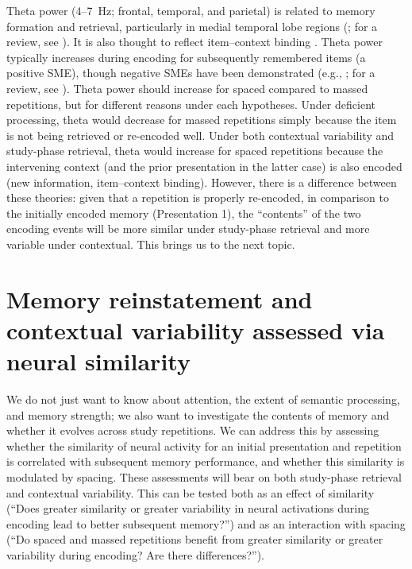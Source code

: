 Theta power (4--7~Hz; frontal, temporal, and parietal) is related to memory formation and retrieval, particularly in medial temporal lobe regions (; for a review, see ).  It is also thought to reflect item--context binding \cite{HansEtal2009a,HansEtal2011a,StauHans2013,SummMang2005}.  Theta power typically increases during encoding for subsequently remembered items (a positive SME), though negative SMEs have been demonstrated (e.g., ; for a review, see ).  Theta power should increase for spaced compared to massed repetitions, but for different reasons under each hypotheses.  Under deficient processing, theta would decrease for massed repetitions simply because the item is not being retrieved or re-encoded well.
Under both contextual variability and study-phase retrieval, theta would increase for spaced repetitions because the intervening context (and the prior presentation in the latter case) is also encoded (new information, item--context binding).
However, there is a difference between these theories: given that a repetition is properly re-encoded, in comparison to the initially encoded memory (Presentation 1), the ``contents'' of the two encoding events will be more similar under study-phase retrieval and more variable under contextual.  This brings us to the next topic.




\section{Memory reinstatement and contextual variability assessed via neural similarity}

We do not just want to know about attention, the extent of semantic processing, and memory strength; we also want to investigate the contents of memory and whether it evolves across study repetitions.
We can address this by assessing whether the similarity of neural activity for an initial presentation and repetition is correlated with subsequent memory performance, and whether this similarity is modulated by spacing.  These assessments will bear on both study-phase retrieval and contextual variability.  This can be tested both as an effect of similarity (``Does greater similarity or greater variability in neural activations during encoding lead to better subsequent memory?'') and as an interaction with spacing (``Do spaced and massed repetitions benefit from greater similarity or greater variability during encoding?  Are there differences?'').

